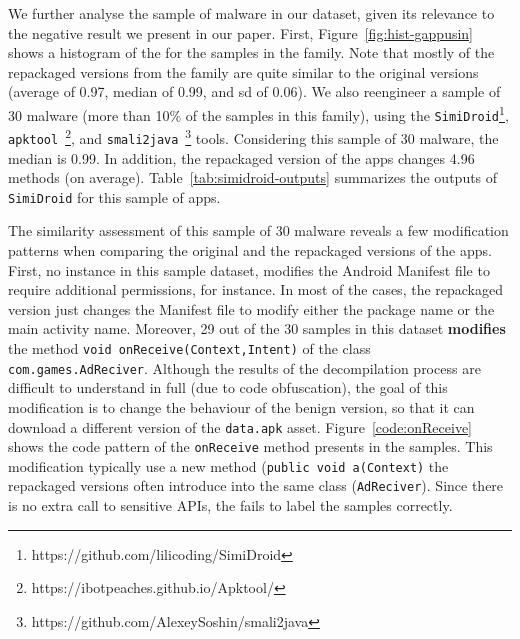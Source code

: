 
We further analyse the sample of \gps malware in our dataset, given its
relevance to the negative result we present in our paper. First,
Figure~\ref{fig:hist-gappusin} shows a histogram of the \sscore for the samples
in the \gps family. Note that mostly of the repackaged versions from the
\gps family are quite similar to the original versions (average \sscore
of 0.97, median \sscore of 0.99, and sd of 0.06). We also reengineer
a sample of 30 \gps malware (more than 10\% of the samples in this
family), using the \texttt{SimiDroid}\footnote{https://github.com/lilicoding/SimiDroid},
\texttt{apktool}~\footnote{https://ibotpeaches.github.io/Apktool/},
and \texttt{smali2java}~\footnote{https://github.com/AlexeySoshin/smali2java} tools.
Considering this sample of 30 \gps malware, the median \sscore is 0.99. In addition,
the repackaged version of the apps changes 4.96 methods (on average). Table~\ref{tab:simidroid-outputs} summarizes
the outputs of \texttt{SimiDroid} for this sample of \gps apps.

The similarity assessment of this sample of 30 \gps malware reveals a few modification patterns when comparing the original and the
repackaged versions of the apps. First, no instance in this \gps sample dataset,
modifies the Android Manifest file to require additional permissions, for instance.
In most of the cases, the repackaged version just changes the Manifest file to modify either
the package name or the main activity name. Moreover, 29 out of the 30 samples in this dataset  {\bf modifies} the 
method \texttt{void onReceive(Context,Intent)} of the class \texttt{com.games.AdReciver}. Although the results of the
decompilation process are difficult to understand in full (due to code obfuscation),
the goal of this modification is to change the behaviour of the benign version, so that it can
download a different version of the \texttt{data.apk} 
asset. Figure~\ref{code:onReceive} shows
the code pattern of the \texttt{onReceive} method presents in the samples. This modification
typically use a new method (\texttt{public void a(Context)}
the repackaged versions often introduce into the same class (\texttt{AdReciver}).
Since there is no extra call to sensitive APIs, the \mas fails to label
the \gps samples correctly. 

